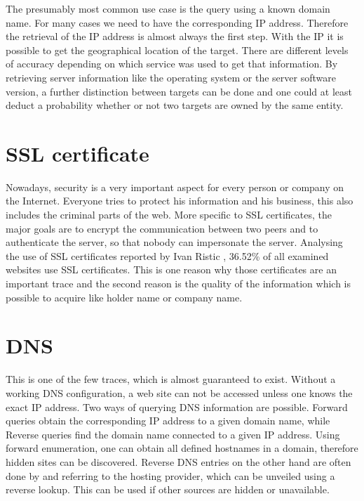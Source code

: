 \documentclass[
	a4paper,					10pt,							twoside,					openright,				notitlepage,			parskip=half,			]{scrreprt}
\begin{document}
The presumably most common use case is the query using a known domain name. 
For many cases we need to have the corresponding \gls{IP} address. 
Therefore the retrieval of the \gls{IP} address is almost always the first step.
With the \gls{IP} it is possible to get the geographical location of the target. There are different levels of accuracy 
depending on which service was used to get that information. 
By retrieving server information like the operating system or the server software version, 
a further distinction between targets can be done and one could at least deduct a probability
whether or not two targets are owned by the same entity.

\section{\gls{SSL} certificate}
\label{sec:seltraces_SSLCert}

Nowadays, security is a very important aspect for every person or company on the Internet. Everyone tries to 
protect his information and his business, this also includes the criminal parts of the web.
More specific to \gls{SSL} certificates, the major goals are to encrypt the communication between two peers and to 
authenticate the server, so that nobody can impersonate the server.
Analysing the use of \gls{SSL} certificates reported by Ivan Ristic \cite{ristic:sslCertificateUsage}, 
36.52\% of all examined websites use \gls{SSL} certificates. 
This is one reason why those certificates are an important trace and the second reason is 
the quality of the information which is possible to acquire like holder name or company name.

\section{\gls{DNS}}
\label{sec:seltraces_DNS}

This is one of the few traces, which is almost guaranteed to exist. Without a working \gls{DNS}
configuration, a web site can not be accessed unless one knows the exact \gls{IP} address. 
Two ways of querying \gls{DNS} information are
possible. Forward queries obtain the corresponding \gls{IP} address to a given domain name,
while Reverse queries find the domain name connected to a given \gls{IP} address. 
Using forward enumeration, one can obtain all defined hostnames in a domain,
therefore hidden sites can be discovered. 
Reverse \gls{DNS} entries on the other hand are often done by and referring to the hosting provider, which can be
unveiled using a reverse lookup. This can be used if other sources are hidden or unavailable.
\end{document}

